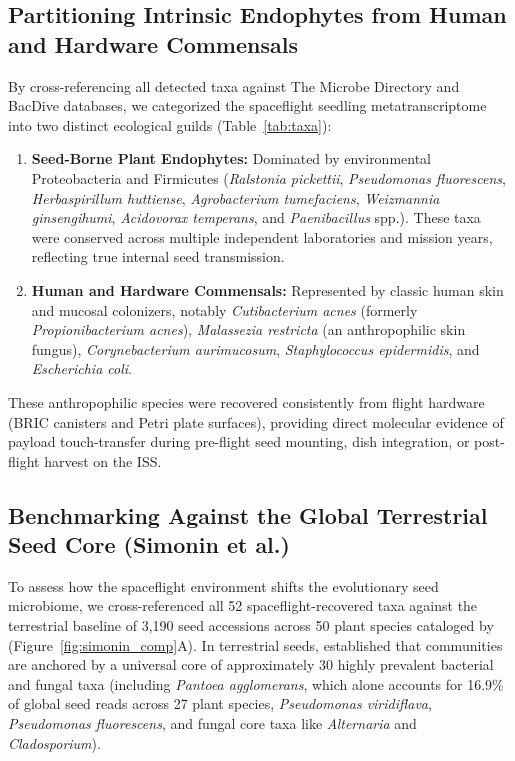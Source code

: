 \subsection{Partitioning Intrinsic Endophytes from Human and Hardware Commensals}
By cross-referencing all detected taxa against The Microbe Directory and BacDive databases, we categorized the spaceflight seedling metatranscriptome into two distinct ecological guilds (Table~\ref{tab:taxa}):
\begin{enumerate}
    \item \textbf{Seed-Borne Plant Endophytes:} Dominated by environmental Proteobacteria and Firmicutes (\textit{Ralstonia pickettii}, \textit{Pseudomonas fluorescens}, \textit{Herbaspirillum huttiense}, \textit{Agrobacterium tumefaciens}, \textit{Weizmannia ginsengihumi}, \textit{Acidovorax temperans}, and \textit{Paenibacillus} spp.). These taxa were conserved across multiple independent laboratories and mission years, reflecting true internal seed transmission.
    \item \textbf{Human and Hardware Commensals:} Represented by classic human skin and mucosal colonizers, notably \textit{Cutibacterium acnes} (formerly \textit{Propionibacterium acnes}), \textit{Malassezia restricta} (an anthropophilic skin fungus), \textit{Corynebacterium aurimucosum}, \textit{Staphylococcus epidermidis}, and \textit{Escherichia coli}.
\end{enumerate}

These anthropophilic species were recovered consistently from flight hardware (BRIC canisters and Petri plate surfaces), providing direct molecular evidence of payload touch-transfer during pre-flight seed mounting, dish integration, or post-flight harvest on the ISS.

\subsection{Benchmarking Against the Global Terrestrial Seed Core (Simonin et al.)}
To assess how the spaceflight environment shifts the evolutionary seed microbiome, we cross-referenced all 52 spaceflight-recovered taxa against the terrestrial baseline of 3,190 seed accessions across 50 plant species cataloged by \citet{simonin2022seed} (Figure~\ref{fig:simonin_comp}A). In terrestrial seeds, \citet{simonin2022seed} established that communities are anchored by a universal core of approximately 30 highly prevalent bacterial and fungal taxa (including \textit{Pantoea agglomerans}, which alone accounts for 16.9\% of global seed reads across 27 plant species, \textit{Pseudomonas viridiflava}, \textit{Pseudomonas fluorescens}, and fungal core taxa like \textit{Alternaria} and \textit{Cladosporium}).

